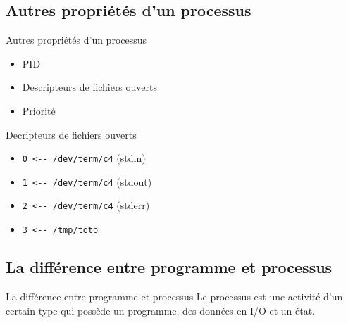 \def\subsectitle{Autres propriétés d'un processus}
\subsection{\subsectitle}
\begin{frame}{\sectitle}
\begin{block}{\subsectitle}
\begin{itemize}
\item PID
\item Descripteurs de fichiers ouverts
\item Priorité
\end{itemize}
\end{block}

\begin{block}{Decripteurs de fichiers ouverts}
\begin{itemize}
\item \verb!0 <-- /dev/term/c4! (stdin)
\item \verb!1 <-- /dev/term/c4! (stdout)
\item \verb!2 <-- /dev/term/c4! (stderr)
\item \verb!3 <-- /tmp/toto!
\end{itemize}
\end{block}
\end{frame}


\def\subsectitle{La différence entre programme et processus}
\subsection{\subsectitle}
\begin{frame}{\sectitle}
\begin{block}{\subsectitle}
Le processus est une activité d'un certain type qui possède un programme, des données en I/O et un état.
\end{block}
\end{frame}

\def\subsectitle{Hierarchie des processus}
